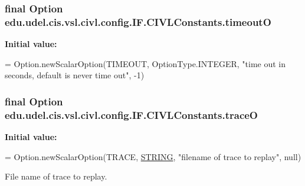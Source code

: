 \subsubsection[{timeout\+O}]{\setlength{\rightskip}{0pt plus 5cm}final Option edu.\+udel.\+cis.\+vsl.\+civl.\+config.\+I\+F.\+C\+I\+V\+L\+Constants.\+timeout\+O\hspace{0.3cm}{\ttfamily [static]}}\label{classedu_1_1udel_1_1cis_1_1vsl_1_1civl_1_1config_1_1IF_1_1CIVLConstants_a4eb3fcc8eb1287d5cc3f32c3ddf004ec}
{\bfseries Initial value\+:}
\begin{DoxyCode}
= Option.newScalarOption(TIMEOUT,
            OptionType.INTEGER,
            \textcolor{stringliteral}{"time out in seconds, default is never time out"}, -1)
\end{DoxyCode}
\hypertarget{classedu_1_1udel_1_1cis_1_1vsl_1_1civl_1_1config_1_1IF_1_1CIVLConstants_a03ec5d26fac6775d6011970883cbc4f2}{}
\subsubsection[{trace\+O}]{\setlength{\rightskip}{0pt plus 5cm}final Option edu.\+udel.\+cis.\+vsl.\+civl.\+config.\+I\+F.\+C\+I\+V\+L\+Constants.\+trace\+O\hspace{0.3cm}{\ttfamily [static]}}\label{classedu_1_1udel_1_1cis_1_1vsl_1_1civl_1_1config_1_1IF_1_1CIVLConstants_a03ec5d26fac6775d6011970883cbc4f2}
{\bfseries Initial value\+:}
\begin{DoxyCode}
= Option.newScalarOption(TRACE, \hyperlink{struct__STRING}{STRING},
            \textcolor{stringliteral}{"filename of trace to replay"}, null)
\end{DoxyCode}


File name of trace to replay. 

\hypertarget{classedu_1_1udel_1_1cis_1_1vsl_1_1civl_1_1config_1_1IF_1_1CIVLConstants_a6da1d3d2111e64af4a8640cfa70249f0}{}
